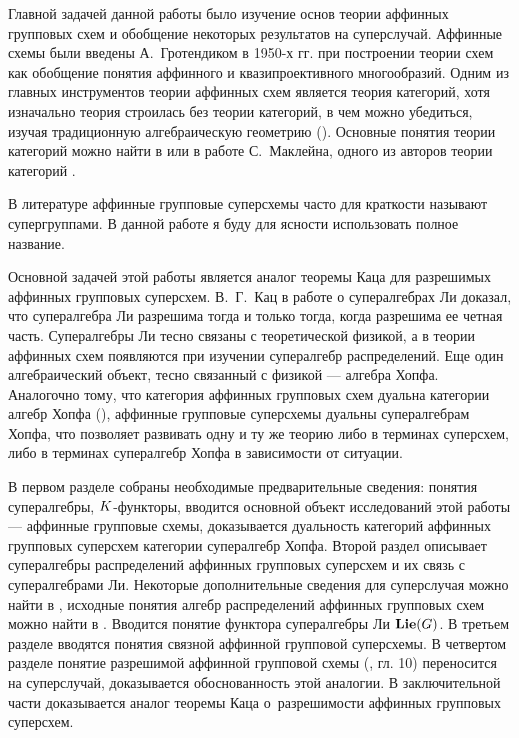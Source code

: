 Главной задачей данной работы было изучение основ теории аффинных групповых
схем и обобщение некоторых результатов на суперслучай.
Аффинные схемы были введены А.~Гротендиком в 1950-х гг. при построении теории схем
как обобщение понятия аффинного и квазипроективного многообразий.
Одним из главных инструментов теории аффинных схем является теория категорий,
хотя изначально теория строилась без теории категорий, в чем можно убедиться,
изучая традиционную алгебраическую геометрию (\cite{shafarevich}).
Основные понятия теории категорий можно найти в \cite{category_introduction}
или в работе С.~Маклейна, одного из авторов теории категорий \cite{mclane}.

В литературе аффинные групповые суперсхемы часто для краткости
называют супергруппами. В данной работе я буду для ясности использовать полное название.

Основной задачей этой работы является аналог теоремы Каца
для разрешимых аффинных групповых суперсхем. В.~Г.~Кац в работе \cite{kac}
о супералгебрах Ли доказал, что супералгебра Ли разрешима тогда и только тогда,
когда разрешима ее четная часть. Супералгебры Ли тесно связаны с теоретической
физикой, а в теории аффинных схем появляются при изучении супералгебр распределений.
Еще один алгебраический объект, тесно связанный с физикой --- алгебра Хопфа.
Аналогочно тому, что категория аффинных групповых схем дуальна категории алгебр Хопфа
(\cite{waterhouse}), аффинные групповые суперсхемы дуальны супералгебрам Хопфа,
что позволяет развивать одну и ту же теорию либо в терминах суперсхем,
либо в терминах супералгебр Хопфа в зависимости от ситуации.

%
В первом разделе собраны необходимые предварительные сведения: 
понятия супералгебры, $K$-функторы,
вводится основной объект исследований этой работы --- аффинные групповые схемы,
доказывается дуальность категорий аффинных групповых суперсхем
категории супералгебр Хопфа.
%
Второй раздел описывает супералгебры распределений аффинных групповых суперсхем
и их связь с супералгебрами Ли. Некоторые дополнительные сведения для суперслучая
можно найти в \cite{affine_quotients}, исходные понятия алгебр распределений
аффинных групповых схем можно найти в \cite{waterhouse}.
Вводится понятие функтора супералгебры Ли $ \mathbf{Lie}(G) $.
%
В третьем разделе вводятся понятия связной аффинной групповой суперсхемы.
%
В четвертом разделе понятие разрешимой аффинной групповой схемы
(\cite{waterhouse}, гл. 10) переносится на суперслучай, доказывается
обоснованность этой аналогии.
%
В заключительной части доказывается аналог теоремы Каца о~разрешимости
аффинных групповых суперсхем.